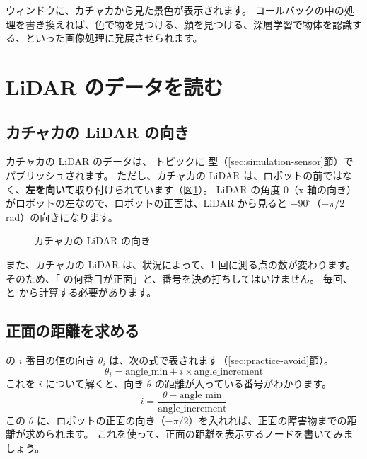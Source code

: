 ウィンドウに、カチャカから見た景色が表示されます。
コールバックの中の処理を書き換えれば、色で物を見つける、顔を見つける、深層学習で物体を認識する、といった画像処理に発展させられます。

\section{LiDAR のデータを読む}
\label{sec:kachaka-lidar}

\subsection{カチャカの LiDAR の向き}

カチャカの LiDAR のデータは、 トピックに \allowbreak{} 型（\ref{sec:simulation-sensor}節）でパブリッシュされます。
ただし、カチャカの LiDAR は、ロボットの前ではなく、\textbf{左を向いて}取り付けられています（図\ref{fig:kachaka-lidar}）。
LiDAR の角度 0（x 軸の向き）がロボットの左なので、ロボットの正面は、LiDAR から見ると $-90^\circ$（$-\pi/2$ rad）の向きになります。

\begin{figure}[tb]
  \centering
  
  \caption{カチャカの LiDAR の向き}
  \label{fig:kachaka-lidar}
\end{figure}

また、カチャカの LiDAR は、状況によって、1 回に測る点の数が変わります。
そのため、「 の何番目が正面」と、番号を決め打ちしてはいけません。
毎回、 と  から計算する必要があります。

\subsection{正面の距離を求める}

 の $i$ 番目の値の向き $\theta_i$ は、次の式で表されます（\ref{sec:practice-avoid}節）。
\[
  \theta_i = \mathrm{angle\_min} + i \times \mathrm{angle\_increment}
\]
これを $i$ について解くと、向き $\theta$ の距離が入っている番号がわかります。
\[
  i = \frac{\theta - \mathrm{angle\_min}}{\mathrm{angle\_increment}}
\]
この $\theta$ に、ロボットの正面の向き（$-\pi/2$）を入れれば、正面の障害物までの距離が求められます。
これを使って、正面の距離を表示するノードを書いてみましょう。



